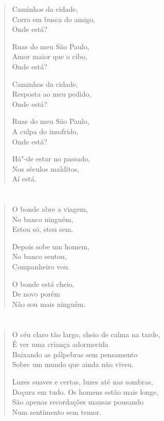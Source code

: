 {\begin{verse}
Caminhos da cidade,\\
Corro em busca do amigo,\\
Onde está?

Ruas do meu São Paulo,\\
Amor maior que o cibo,\\
Onde está?

Caminhos da cidade,\\
Resposta ao meu pedido,\\
Onde está?

Ruas do meu São Paulo,\\
A culpa do insofrido,\\
Onde está?

Há"-de estar no passado,\\
Nos séculos malditos,\\
Aí está.
\end{verse}

\chapter*{}

\begin{verse}
O bonde abre a viagem,\\
No banco ninguém,\\
Estou só, stou sem.

Depois sobe um homem,\\
No banco sentou,\\
Companheiro vou.

O bonde está cheio,\\
De novo porém\\
Não sou mais ninguém.
\end{verse}

\chapter*{}

\begin{verse}
O céu claro tão largo, cheio de calma na tarde,\\
É ver uma criança adormecida\\
Baixando as pálpebras sem pensamento\\
Sobre um mundo que ainda não viveu.

Luzes suaves e certas, luzes até nas sombras,\\
Doçura em tudo. Os homens estão mais longe,\\
São apenas recordações mansas pousando\\
Num sentimento sem temor.


\end{verse}}
